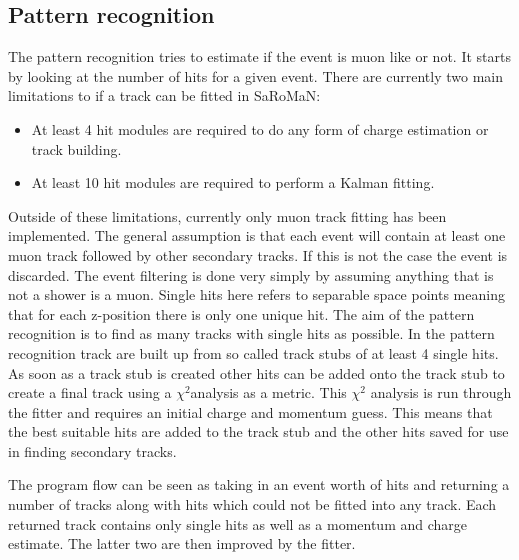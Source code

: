 \subsection{Pattern recognition}
The pattern recognition tries to estimate if the event is muon like or not. It starts by looking at the number of hits for a given event. There are currently two main limitations to if a track can be fitted in SaRoMaN:
\begin{itemize}
\item At least 4 hit modules are required to do any form of charge estimation or track building.
\item At least 10 hit modules are required to perform a Kalman fitting.
\end{itemize}
Outside of these limitations, currently only muon track fitting has been implemented. The general assumption is that each event will contain at least one muon track followed by other secondary tracks. If this is not the case the event is discarded. The event filtering is done very simply by assuming anything that is not a shower is a muon. Single hits here refers to separable space points meaning that for each z-position there is only one unique hit. The aim of the pattern recognition is to find as many tracks with single hits as possible. In the pattern recognition track are built up from so called track stubs of at least 4 single hits. As soon as a track stub is created other hits can be added onto the track stub to create a final track using a $\chi^2$analysis as a metric. This $\chi^2$ analysis is run through the fitter and requires an initial charge and momentum guess. This means that the best suitable hits are added to the track stub and the other hits saved for use in finding secondary tracks. 

The program flow can be seen as taking in an event worth of hits and returning a number of tracks along with hits which could not be fitted into any track. Each returned track contains only single hits as well as a momentum and charge estimate. The latter two are then improved by the fitter.


